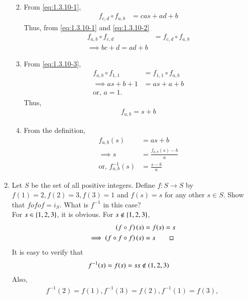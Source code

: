 \begin{enumerate}[label=\arabic*.,ref=\thesubsection.\theenumi]
\begin{enumerate}
\begin{align}
		\end{align}
	\item  From
			\eqref{eq:1.3.10-1},
		\begin{align}
			\label{eq:1.3.10-2}
			f_{c,d}\circ f_{a,b} 
			&=cas+ad+ b
		\end{align}
		Thus, from 
			\eqref{eq:1.3.10-1}
			and 
			\eqref{eq:1.3.10-2}
		\begin{align}
			f_{a,b} \circ f_{c,d} &= f_{c,d} \circ f_{a,b} 
			\\
			\implies bc+d = ad+b
			\label{eq:1.3.10-3}
		\end{align}
	\item  From 
			\eqref{eq:1.3.10-3},
		\begin{align}
			f_{a,b} \circ f_{1,1} &= f_{1,1} \circ f_{a,b}
			\\
			\implies as+b+1 &= as+a+b
			\\
			\text{or, } a = 1.
		\end{align}
		Thus, 
		\begin{align}
			f_{a,b}  = s+b
		\end{align}
	\item  From the definition,
		\begin{align}
			f_{a,b}(s)  &= as+b
			\\
			\implies s &=\frac{f_{a,b}(s) -b}{a}
			\\
			\text{or, }f^{-1}_{a,b}(s) &= \frac{s-b}{a}
		\end{align}
\end{enumerate}
\item Let $S$ be the set of all positive integers. Define $f: S  \rightarrow S$ by $f(1) = 2, f(2) = 3, f(3) = 1$ and $f(s) = s$ for any other $s \in S$. Show that $f o f o f = i_S$. What is $f^{-1}$ in this case?
	\\
	\solution For
$s \in \left\{1,2,3\right\}$, it is obvious.  For
	$s \notin \left\{1,2,3\right\}$,
		\begin{align}
			\left(f\circ f\right) (s) &= f(s) = s
			\\
			\implies \left(f\circ f\circ f\right) (s) &=  s \qed
		\end{align}
		It is easy to verify that 
		\begin{align}
			f^{-1}(s) = f(s)= s & s \notin \left(1,2,3\right)
		\end{align}
		Also,
		\begin{align}
			f^{-1}(2) = f(1),
			f^{-1}(3) = f(2),
			f^{-1}(1) = f(3),
		\end{align}
\end{enumerate}
